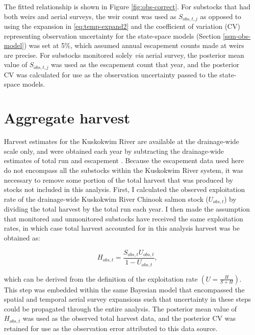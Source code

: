 \documentclass[12pt,]{book}
\theoremstyle{definition}
\theoremstyle{definition}
\theoremstyle{definition}
\theoremstyle{remark}
\begin{document}
\noindent
The fitted relationship is shown in Figure \ref{fig:obs-correct}. For
substocks that had both weirs and aerial surveys, the weir count was
used as \(S_{obs,t,j}\) as opposed to using the expansion in
\eqref{eq:temp-expand2} and the coefficient of variation (CV) representing
observation uncertainty for the state-space models (Section
\ref{ssm-obs-model}) was set at 5\%, which assumed annual escapement
counts made at weirs are precise. For substocks monitored solely
\emph{via} aerial survey, the posterior mean value of \(S_{obs,t,j}\)
was used as the escapement count that year, and the posterior CV was
calculated for use as the observation uncertainty passed to the
state-space models.

\section{Aggregate harvest}\label{harv-expansion}

\noindent
Harvest estimates for the Kuskokwim River are available at the
drainage-wide scale only, and were obtained each year by subtracting the
drainage-wide estimates of total run and escapement
\citep{liller-etal-2018}. Because the escapement data used here do not
encompass all the substocks within the Kuskokwim River system, it was
necessary to remove some portion of the total harvest that was produced
by stocks not included in this analysis. First, I calculated the
observed exploitation rate of the drainage-wide Kuskokwim River Chinook
salmon stock (\(U_{obs,t}\)) by dividing the total harvest by the total
run each year. I then made the assumption that monitored and unmonitored
substocks have received the same exploitation rates, in which case total
harvest accounted for in this analysis harvest was be obtained as:

\begin{equation}
  H_{obs,t} = \frac{S_{obs,t} U_{obs,t}}{1-U_{obs,t}},
  \label{eq:H-obs}
\end{equation}

\noindent
which can be derived from the definition of the exploitation rate
\(\left(U = \frac{H}{S+H}\right)\). This step was embedded within the
same Bayesian model that encompassed the spatial and temporal aerial
survey expansions such that uncertainty in these steps could be
propagated through the entire analysis. The posterior mean value of
\(H_{obs,t}\) was used as the observed total harvest data, and the
posterior CV was retained for use as the observation error attributed to
this data source.
\end{document}
